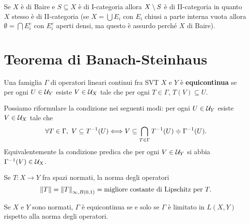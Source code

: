\begin{remark}
Se $X$ \`e di Baire e $S\subseteq X$ \`e di I-categoria allora $X\setminus S$ \`e di II-categoria in quanto $X$ stesso \`e di II-categoria (se $X=\bigcup E_i$ con $E_i$ chiusi a parte interna vuota allora $\emptyset=\bigcap E_i^c$ con $E_i^c$ aperti densi, ma questo \`e assurdo perch\'e $X$ di Baire).
\end{remark}

\section{Teorema di Banach-Steinhaus}

\begin{definition}
Una famiglia $\Gamma$ di operatori lineari continui fra SVT $X$ e $Y$ \`e \textbf{equicontinua} se per ogni $U\in\mathcal{U}_Y$ esiste $V\in \mathcal{U}_X$ tale che per ogni $T\in\Gamma$, $T(V)\subseteq U$.
\end{definition}

\begin{remark}
Possiamo riformulare la condizione nei seguenti modi: per ogni $U\in\mathcal{U}_Y$ esiste $V\in\mathcal{U}_X$ tale che
\[\forall T\in\Gamma,\ V\subseteq T^{-1}(U)\Longleftrightarrow V\subseteq \bigcap_{T\in \Gamma}T^{-1}(U)\doteqdot \Gamma^{-1}(U).\]
Equivalentemente la condizione predica che per ogni $V\in\mathcal{U}_Y$ si abbia $\Gamma^{-1}(V)\in\mathcal{U}_X$.
\end{remark}

\begin{remark}
Se $T:X\to Y$ fra spazi normati, la norma degli operatori
\[\left\Vert{T}\right\Vert=\left\Vert{T}\right\Vert_{\infty,B(0,1)}=\text{migliore costante di Lipschitz per }T.\]
\end{remark}

\begin{example}
Se $X$ e $Y$ sono normati, $\Gamma$ \`e equicontinua se e solo se $\Gamma$ \`e limitato in $L(X,Y)$ rispetto alla norma degli operatori.
\end{example}


